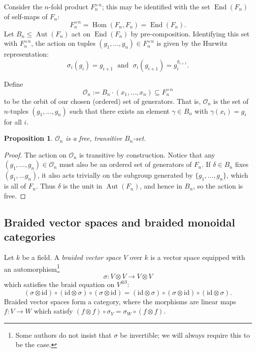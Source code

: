 \documentclass[12pt]{article}
\DeclareMathOperator{\Hom}{Hom}
\DeclareMathOperator{\End}{End}
\DeclareMathOperator{\Aut}{Aut}
\newcommand{\OO}{\mathcal{O}}
\newcommand{\id}{\mbox{id}}
\theoremstyle{plain}
\newtheorem{prop}[thm]{Proposition}
\theoremstyle{definition}
\theoremstyle{remark}
\begin{document}
Consider the $n$-fold product $F_n^{\times n}$; this may be identified with the set $\End(F_n)$ of self-maps of $F_n$:
%
$$F_n^{\times n} = \Hom(F_n, F_n) = \End(F_n).$$
%
Let $B_n\leq \Aut(F_n)$ act on $\End(F_n)$ by pre-composition.  Identifying this set with $F_n^{\times n}$, the action on tuples $(g_1, \dots, g_n) \in F_n^{\times n}$ is given by the Hurwitz representation:
%
$$\sigma_i(g_i) = g_{i+1} \; \mbox{ and } \; \sigma_i(g_{i+1}) = g_i^{g_{i+1}}.$$


Define 
%
$$\OO_n := B_n \cdot(x_1, \dots, x_n) \subseteq F_n^{\times n}$$
%
to be the orbit of our chosen (ordered) set of generators.  That is, $\OO_n$ is the set of $n$-tuples $(g_1, \dots, g_n)$ such that there exists an element $\gamma \in B_n$ with $\gamma(x_i) = g_i$ for all $i$. 

\begin{prop}

$\OO_n$ is a free, transitive $B_n$-set.

\end{prop}

\begin{proof} 

The action on $\OO_n$ is transitive by construction.  Notice that any $(g_1, \dots, g_n) \in \OO_n$ must also be an ordered set of generators of $F_n$.  If $\delta \in B_n$ fixes $(g_1, \dots g_n)$, it also acts trivially on the subgroup generated by $\{g_1, \dots, g_n\}$, which is all of $F_n$.  Thus $\delta$ is the unit in $\Aut(F_n)$, and hence in $B_n$, so the action is free.

\end{proof}

\subsection{Braided vector spaces and braided monoidal categories} \label{br_mon_sec}

Let $k$ be a field. A \emph{braided vector space} $V$ over $k$ is a vector space equipped with an automorphism\footnote{Some authors do not insist that $\sigma$ be invertible; we will always require this to be the case.}
%
$$\sigma: V \otimes V \to V \otimes V$$
%
which satisfies the braid equation on $V^{\otimes 3}$:
%
%
$$(\sigma \otimes \id) \circ (\id \otimes \sigma) \circ (\sigma \otimes \id) =  (\id \otimes \sigma) \circ (\sigma \otimes \id) \circ (\id \otimes \sigma).$$
%
Braided vector spaces form a category, where the morphisms are linear maps $f:V \to W$ which satisfy $(f \otimes f) \circ \sigma_V = \sigma_W \circ (f \otimes f)$.  
\end{document}

